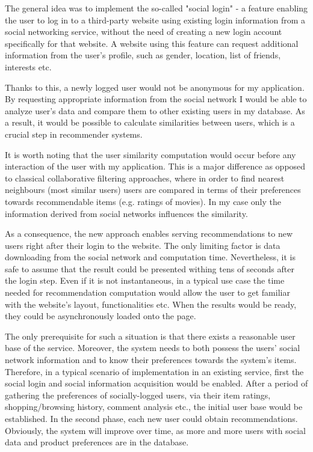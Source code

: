 \documentclass[12pt]{report}
\begin{document}
The general idea was to implement the so-called "social login" - \cite{social_login} a feature enabling the user to log in to a third-party website using existing login information from a social networking service, without the need of creating a new login account specifically for that website. A website using this feature can request additional information from the user's profile, such as gender, location, list of friends, interests etc. 

Thanks to this, a newly logged user would not be anonymous for my application. By requesting appropriate information from the social network I would be able to analyze user's data and compare them to other existing users in my database. As a result, it would be possible to calculate similarities between users, which is a crucial step in recommender systems.

It is worth noting that the user similarity computation would occur before any interaction of the user with my application. This is a major difference as opposed to classical collaborative filtering approaches, where in order to find nearest neighbours (most similar users) users are compared in terms of their preferences towards recommendable items (e.g. ratings of movies). In my case only the information derived from social networks influences the similarity.

As a consequence, the new approach enables serving recommendations to new users right after their login to the website. The only limiting factor is data downloading from the social network and computation time. Nevertheless, it is safe to assume that the result could be presented withing tens of seconds after the login step. Even if it is not instantaneous, in a typical use case the time needed for recommendation computation would allow the user to get familiar with the website's layout, functionalities etc. When the results would be ready, they could be asynchronously loaded onto the page. 

The only prerequisite for such a situation is that there exists a reasonable user base of the service. Moreover, the system needs to both possess the users' social network information and to know their preferences towards the system's items. Therefore, in a typical scenario of implementation in an existing service, first the social login and social information acquisition would be enabled. After a period of gathering the preferences of socially-logged users, via their item ratings, shopping/browsing history, comment analysis etc., the initial user base would be established. In the second phase, each new user could obtain recommendations. Obviously, the system will improve over time, as more and more users with social data and product preferences are in the database.
\end{document}
